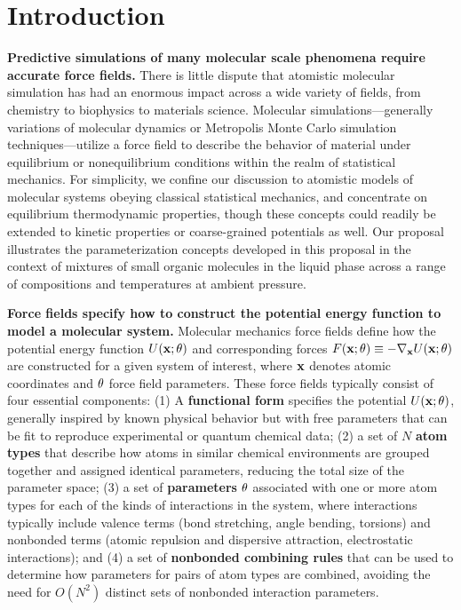 \documentclass[aps,pre,twocolumn,nofootinbib,superscriptaddress,linenumbers]{revtex4-1}
\begin{document}
\section{Introduction}

{\bf Predictive simulations of many molecular scale phenomena require accurate force fields.} 
There is little dispute that atomistic molecular simulation has had an enormous impact across a wide variety of fields, from chemistry to biophysics to materials science.
Molecular simulations---generally variations of molecular dynamics or Metropolis Monte Carlo simulation techniques---utilize a force field to describe the behavior of material under equilibrium or nonequilibrium conditions within the realm of statistical mechanics.  
For simplicity, we confine our discussion to atomistic models of molecular systems obeying classical statistical mechanics, and concentrate on equilibrium thermodynamic properties, though these concepts could readily be extended to kinetic properties or coarse-grained potentials as well.
Our proposal illustrates the parameterization concepts developed in this proposal in the context of mixtures of small organic molecules in the liquid phase across a range of compositions and temperatures at ambient pressure.

{\bf Force fields specify how to construct the potential energy function to model a molecular system.} 
Molecular mechanics force fields define how the potential energy function $U({\bf x};{\bf \theta})$ and corresponding forces $F({\bf x}; {\bf \theta}) \equiv -\nabla_{\bf x}U({\bf x}; {\bf \theta})$ are constructed for a given system of interest, where ${\bf x}$ denotes atomic coordinates and ${\bf \theta}$ force field parameters.
These force fields typically consist of four essential components:  
(1) A {\bf functional form} specifies the potential $U({\bf x}; {\bf \theta})$, generally inspired by known physical behavior but with free parameters that can be fit to reproduce experimental or quantum chemical data; (2) a set of $N$ {\bf atom types} that describe how atoms in similar chemical environments are grouped together and assigned identical parameters, reducing the total size of the parameter space; (3) a set of {\bf parameters} ${\bf \theta}$ associated with one or more atom types for each of the kinds of interactions in the system, where interactions typically include valence terms (bond stretching, angle bending, torsions) and nonbonded terms (atomic repulsion and dispersive attraction, electrostatic interactions); and (4) a set of {\bf nonbonded combining rules} that can be used to determine how parameters for pairs of atom types are combined, avoiding the need for $O(N^2)$ distinct sets of nonbonded interaction parameters.
\end{document}
